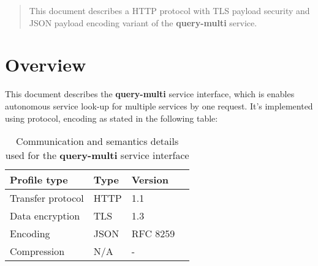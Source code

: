 \documentclass[a4paper]{arrowhead}
\begin{document}
\ArrowheadDate{\today}
\ArrowheadSetup

\begin{center}
  \vspace*{1cm}
  \huge{\arrowtitle}

  \vspace*{0.2cm}
  \LARGE{\arrowtype}
  \vspace*{1cm}
\end{center}

  \vspace*{\fill}


  \vspace*{1cm}
  \vspace*{\fill}

  \begin{abstract}
    This document describes a HTTP protocol with TLS payload
    security and JSON payload encoding variant of the \textbf{query-multi} service.
  \end{abstract}
  \vspace*{1cm}

\newpage

\tableofcontents
\newpage

\section{Overview}
\label{sec:overview}

This document describes the \textbf{query-multi} service interface,
which is enables autonomous service look-up for multiple services by one request. It's implemented using protocol, encoding as stated in the following table:

\begin{table}[ht!]
  \centering
  \begin{tabular}{|l|l|l|l|}
    \rowcolor{gray!33} Profile type & Type & Version \\ \hline
    Transfer protocol & HTTP & 1.1 \\ \hline
    Data encryption & TLS & 1.3 \\ \hline
    Encoding & JSON & RFC 8259 \cite{rfc8259} \\ \hline
    Compression & N/A & - \\ \hline
  \end{tabular}
  \caption{Communication and semantics details used for the \textbf{query-multi}
    service interface}
  \label{tab:comunication_semantics_profile}
\end{table}
\end{document}
